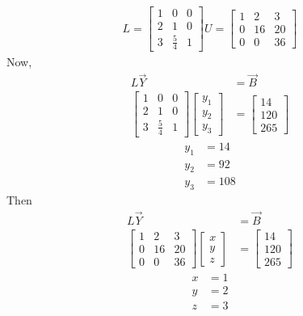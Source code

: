 \documentclass{report}
\begin{document}
{        \begin{align*}
            L = \begin{bmatrix}
                1&0&0\\
                2&1&0\\
                3&\frac{5}{4}&1
            \end{bmatrix}
            U=\begin{bmatrix}
                1&2&3\\
                0&16&20\\
                0&0&36
            \end{bmatrix}
        \end{align*}
        Now,
        \begin{align*}
         L\vec{Y} & = \vec{B}\\
             \begin{bmatrix}
                1&0&0\\
                2&1&0\\
                3&\frac{5}{4}&1
            \end{bmatrix}
            \begin{bmatrix}
                y_1\\y_2\\y_3
            \end{bmatrix}& = \begin{bmatrix}
                14\\120\\265
            \end{bmatrix}
        \end{align*}
        \begin{align*}
            y_1& = 14\\
            y_2& =92\\
            y_3& =108
        \end{align*}
        Then 
        \begin{align*}
            L\vec{Y} & = \vec{B}\\
            \begin{bmatrix}
                1&2&3\\
                0&16&20\\
                0&0&36
            \end{bmatrix}
            \begin{bmatrix}
                x\\y\\z
            \end{bmatrix}& = \begin{bmatrix}
                14\\120\\265
            \end{bmatrix}
        \end{align*}
        \begin{align*}
            x& =1\\
            y& =2\\
            z& =3
        \end{align*}
}
\end{document}
